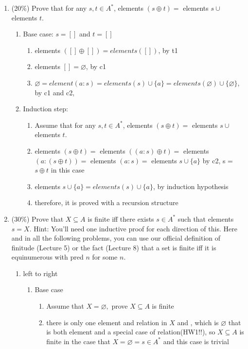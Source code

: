 \documentclass[10pt]{article}
\begin{document}
\begin{enumerate}
    \item (20\%) Prove that for any $s, t \in A^*$, elements $(s \oplus t)=$ elements $s \cup$ elements $t$.
    \begin{enumerate}
    \item Base case: $s = []$ and $t = []$
    \begin{enumerate}
        \item elements $([] \oplus []) = elements ([])$, by t1
        \item elements $[] = \varnothing$, by c1
        \item $\varnothing = element(a:s) = {elements (s)} \cup {\{a\}} = {elements (\varnothing)\cup \{ \varnothing \} }$, by c1 and c2, 
    \end{enumerate}
    \item Induction step: 
    \begin{enumerate}
    \item Assume that for any $s, t \in A^*$, elements $(s \oplus t)=$ elements $s \cup$ elements $t$.
    \item elements $(s \oplus t)=$ elements $((a:s) \oplus t) =$ elements $(a:(s \oplus t)) =$ elements $(a: s)=$ elements $s \cup\{a\}$ by c2, s = $s \oplus t$ in this case
    \item elements $s \cup\{a\} = elements (s) \cup\{a\}$, by induction hypothesis
    \item therefore, it is proved with a recursion structure
    \end{enumerate}
    \end{enumerate}
    \item (30\%) Prove that $X \subseteq A$ is finite iff there exists $s \in A^*$ such that elements $s=X$.
    Hint: You'll need one inductive proof for each direction of this. Here and in all the following problems, you can use our official definition of finitude (Lecture 5) or the fact (Lecture 8) that a set is finite iff it is equinumerous with pred $n$ for some $n$.
    \begin{enumerate}
    \item left to right
    \begin{enumerate}
        \item Base case
        \begin{enumerate}
            \item Assume that $X = \varnothing, $ prove $  X\subseteq A$ is finite
            \item there is only one element and relation in $X$ and , which is $\varnothing$ that is both element and a special case of relation(HW1!!), so $X\subseteq A$ is finite in the case that $X = \varnothing = s \in A^*$ and this case is trivial 

\end{enumerate}
\end{enumerate}
\end{enumerate}
\end{enumerate}
\end{document}
